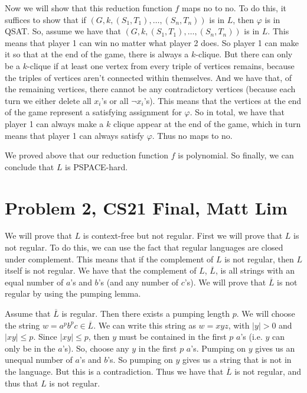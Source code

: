 \documentclass{article}
\begin{document}
\begin{description}
        Now we will show that this reduction function $f$ maps no to no. To do
        this, it suffices to show that if $(G,k, (S_1, T_1), \dots, (S_n, T_n))$
        is in $L$, then $\varphi$ is in QSAT. So, assume we have that
        $(G,k, (S_1, T_1), \dots, (S_n, T_n))$ is in $L$. This means that player
        1 can win no matter what player 2 does. So player 1 can make it so that
        at the end of the game, there is always a $k$-clique. But there can only
        be a $k$-clique if at least one vertex from every triple of vertices
        remains, because the triples of vertices aren't connected within
        themselves. And we have that, of the remaining vertices, there cannot
        be any contradictory vertices (because each turn we either delete
        all $x_i$'s or all $\neg x_i$'s). This means that the vertices at the
        end of the game represent a satisfying assignment for $\varphi$.
        So in total, we have that player 1 can always make a $k$ clique appear
        at the end of the game, which in turn means that player 1 can always
        satisfy $\varphi$. Thus no maps to no.

        We proved above that our reduction function $f$ is polynomial. So
        finally, we can conclude that $L$ is PSPACE-hard.
\end{description}
\newpage

\section*{Problem 2, CS21 Final, Matt Lim}
We will prove that $L$ is context-free but not regular. First we will prove that
$L$ is not regular. To do this, we can use the fact that regular languages
are closed under complement. This means that if the complement of $L$ is not
regular, then $L$ itself is not regular. We have that the complement of $L$,
$\overline{L}$, is all strings with an equal number of $a$'s and $b$'s (and any number of
$c$'s). We will prove that $\overline{L}$ is not regular by using the pumping
lemma.

Assume that $\overline{L}$ is regular. Then there exists a pumping length $p$. We will
choose the string $w = a^pb^pc \in \overline{L}$. We can write this string as
$w = xyz$, with $|y| > 0$ and $|xy| \leq p$. Since $|xy| \leq p$, then $y$ must be contained
in the first $p$ $a$'s (i.e. $y$ can only be in the $a$'s). So, choose any $y$
in the first $p$ $a$'s. Pumping on $y$ gives us an unequal number of $a$'s and
$b$'s. So pumping on $y$ gives us a string that is not in the language. But
this is a contradiction. Thus we have that $\overline{L}$ is not regular, and
thus that $L$ is not regular.
\end{document}
